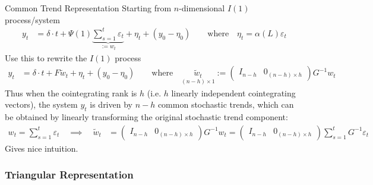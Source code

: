 \documentclass[aspectratio=169, handout]{beamer}
\begin{document}
{\footnotesize
\begin{frame}{Common Trend Representation}
Starting from $n$-dimensional $I(1)$ process/system
\begin{align*}
  y_t
  &=
  \delta \cdot t
  +
  \Psi(1)
  \underbrace{
  \sum_{s=1}^t
  \varepsilon_t
  }_{:=w_t}
  +
  \eta_t
  +
  (y_0-\eta_0)
  \qquad\text{where}\quad
  \eta_t
  =
  \alpha(L)\varepsilon_t
\end{align*}
\pause
Use this to rewrite the $I(1)$ process
\begin{align*}
  y_t
  &=
  \delta \cdot t
  +
  F\tilde{w}_t
  +
  \eta_t
  +
  (y_0-\eta_0)
  \qquad \text{where}\quad
  \underset{(n-h)\times 1}{\tilde{w}_t} :=
  \begin{pmatrix}
    I_{n-h} & 0_{(n-h)\times h}
  \end{pmatrix}
  G^{-1}w_t
\end{align*}
\pause
Thus when the cointegrating rank is $h$ (i.e. $h$ linearly independent
cointegrating vectors),
the system $y_t$ is \alert{driven by $n-h$ common stochastic trends},
which can be obtained by linearly transforming the original stochastic
trend component:
\begin{align*}
  w_t
  =
  \sum_{s=1}^t \varepsilon_t
  \quad\implies\quad
  \tilde{w}_t
  &=
  \begin{pmatrix}
    I_{n-h} & 0_{(n-h)\times h}
  \end{pmatrix}
  G^{-1}w_t
  =
  \begin{pmatrix}
    I_{n-h} & 0_{(n-h)\times h}
  \end{pmatrix}
  \sum_{s=1}^t
  G^{-1}
  \varepsilon_t
\end{align*}
Gives nice intuition.
\end{frame}
}

\subsubsection{Triangular Representation}
\end{document}
